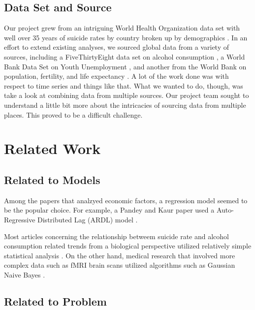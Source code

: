 \documentclass{article}
\begin{document}
\begin{multicols}{2}
\subsection{Data Set and Source} Our project grew from an intriguing 
World Health Organization data set with well over 35 years of suicide rates by country broken up by demographics . In an effort to extend existing analyses, we sourced global data from a variety of sources, including a FiveThirtyEight data set on alcohol consumption , a World Bank Data Set on Youth Unemployment , and another from the World Bank on population, fertility, and life expectancy . A lot of the work done was with respect to time series and things like that. What we wanted to do, though, was take a look at combining data from multiple sources. 
Our project team sought to understand a little bit more about the intricacies of sourcing data from multiple places. This proved to be a difficult challenge.  

\section{Related Work}
\subsection{Related to Models} 

Among the papers that analzyed economic factors, a regression model seemed to be the popular choice. For example, a Pandey and Kaur paper used a Auto-Regressive Distributed Lag (ARDL) model . 

Most articles concerning the relationship betweem suicide rate and alcohol consumption related trends from a biological perspective utilized relatively simple statistical analysis . On the other hand, medical research that involved more complex data such as fMRI brain scans utilized algorithms such as Gaussian Naive Bayes .

\subsection{Related to Problem} 


\end{multicols}
\end{document}
